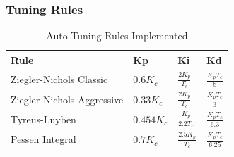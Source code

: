 \documentclass[12pt,a4paper]{article}
\begin{document}
\subsubsection{Tuning Rules}
\begin{table}[H]
\centering
\begin{tabular}{@{}llll@{}}
\toprule
\textbf{Rule} & \textbf{Kp} & \textbf{Ki} & \textbf{Kd} \\
\midrule
Ziegler-Nichols Classic & $0.6 K_c$ & $\frac{2K_p}{T_c}$ & $\frac{K_p T_c}{8}$ \\
Ziegler-Nichols Aggressive & $0.33 K_c$ & $\frac{2K_p}{T_c}$ & $\frac{K_p T_c}{3}$ \\
Tyreus-Luyben & $0.454 K_c$ & $\frac{K_p}{2.2 T_c}$ & $\frac{K_p T_c}{6.3}$ \\
Pessen Integral & $0.7 K_c$ & $\frac{2.5 K_p}{T_c}$ & $\frac{K_p T_c}{6.25}$ \\
\bottomrule
\end{tabular}
\caption{Auto-Tuning Rules Implemented}
\end{table}
\end{document}
